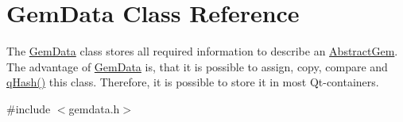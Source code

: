 \hypertarget{class_gem_data}{\section{Gem\+Data Class Reference}
\label{class_gem_data}
}


The \hyperlink{class_gem_data}{Gem\+Data} class stores all required information to describe an \hyperlink{class_abstract_gem}{Abstract\+Gem}.  The advantage of \hyperlink{class_gem_data}{Gem\+Data} is, that it is possible to assign, copy, compare and \hyperlink{abstractgem_8cpp_a92fb5a3a6f53f07f0f9653dd299d31ff}{q\+Hash()} this class. Therefore, it is possible to store it in most Qt-\/containers.  




{\ttfamily \#include $<$gemdata.\+h$>$}

